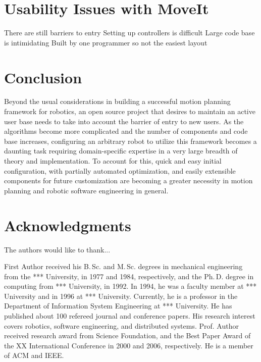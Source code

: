 \documentclass[10pt,journal,compsoc]{joser1}
\begin{document}
{\section{Usability Issues with MoveIt}

There are still barriers to entry
Setting up controllers is difficult
Large code base is intimidating
Built by one programmer so not the easiest layout


\section{Conclusion}
Beyond the usual considerations in building a successful motion planning framework for robotics, an open source project that desires to maintain an active user base needs to take into account the barrier of entry to new users. As the algorithms become more complicated and the number of components and code base increases, configuring an arbitrary robot to utilize this framework becomes a daunting task requiring domain-specific expertise in a very large breadth of theory and implementation. To account for this, quick and easy initial configuration, with partially automated optimization, and easily extensible components for future customization are becoming a greater necessity in motion planning and robotic software engineering in general. 

\section*{Acknowledgments}
The authors would like to thank...





\begin{IEEEbiography}[{coleman}]{First Author}
received his B.\,Sc. and
M.\,Sc. degrees in mechanical engineering from the *** University,
in 1977 and 1984, respectively, and the Ph.\,D. degree in
computing from *** University, in 1992. In 1994, he was a
faculty member at *** University and in 1996 at ***
University. Currently, he is a professor in the Department of
Information System Engineering at *** University.
He has published about 100 refereed journal and conference papers.
His research interest covers robotics, software engineering, and distributed systems.
Prof. Author received research award from Science Foundation, and
the Best Paper Award of the XX International Conference in 2000 and
2006, respectively. He is a member of ACM and IEEE.
\end{IEEEbiography}

}
\end{document}
